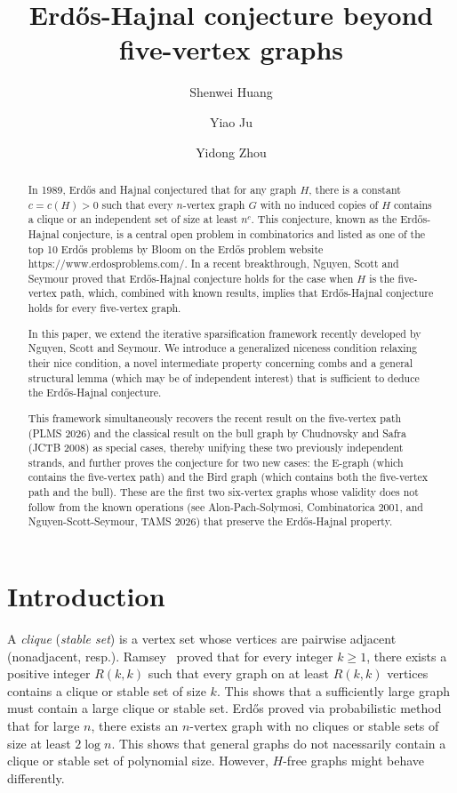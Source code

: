 \documentclass[a4paper,11pt]{article}
\title{Erd\H{o}s-Hajnal conjecture beyond five-vertex graphs}
\author[1]{Shenwei Huang}
\author[2]{Yiao Ju}
\author[2]{Yidong Zhou}
\affil[1] {School of Mathematical Sciences and LPMC, Nankai University, Tianjin 300071, P.R.~China. Email: {\tt shenweihuang@nankai.edu.cn}.}
\affil[2] {College of Computer Science, Nankai University, Tianjin 300350, China.}
\begin{document}
\maketitle

\begin{abstract}
    In 1989, Erd\H{o}s and Hajnal conjectured that for any graph $H$, there is a constant $c=c(H)>0$ such that every $n$-vertex graph $G$ with no induced copies of $H$ contains a clique or an independent set of size at least $n^{c}$. This conjecture, known as the Erd\H{o}s-Hajnal conjecture, is a central open problem in combinatorics and listed as one of the top 10  Erd\H{o}s problems by Bloom on the Erd\H{o}s problem website https://www.erdosproblems.com/.
    In a recent breakthrough, Nguyen, Scott and Seymour proved that Erd\H{o}s-Hajnal conjecture holds for the case when $H$ is the five-vertex path, which, combined with known results, implies that Erd\H{o}s-Hajnal conjecture holds for every five-vertex graph. 


    In this paper, we extend the iterative sparsification framework recently developed by Nguyen, Scott and Seymour. We introduce a generalized niceness condition relaxing their nice condition, a novel intermediate property concerning combs and a general structural lemma (which may be of independent interest)
    that is sufficient to deduce the Erd\H{o}s-Hajnal conjecture.

    This framework simultaneously recovers the recent result on the five-vertex path (PLMS 2026) and the classical result on the bull graph by Chudnovsky and Safra (JCTB 2008) as special cases, thereby unifying these two previously independent strands, and further proves the conjecture for two new cases: the E-graph (which contains the five-vertex path) and the Bird graph (which contains both the five-vertex path and the bull). These are the first two six-vertex graphs whose validity does not follow from the known operations (see Alon-Pach-Solymosi, Combinatorica 2001, and Nguyen-Scott-Seymour, TAMS 2026) that preserve the  Erd\H{o}s-Hajnal property.
\end{abstract}

\section{Introduction}

A {\em clique} ({\em stable set}) is a vertex set whose vertices are pairwise adjacent (nonadjacent, resp.).
Ramsey~\cite{Ra30} proved that for every integer $k\geq 1$, there exists a positive integer $R(k,k)$ such that every graph on at least $R(k,k)$ vertices contains a clique or stable set of size $k$. This shows that a sufficiently large graph must contain a large clique or stable set. Erd\H{o}s \cite{Er47} proved via probabilistic method that for large $n$, there exists an $n$-vertex graph with no cliques or stable sets of size at least $2\log n$. This shows that general graphs do not nacessarily contain a clique or stable set of polynomial size. However, $H$-free graphs might behave differently.
\end{document}
